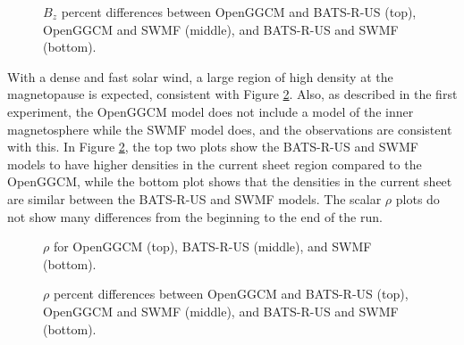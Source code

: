 \begin{figure}
	\centering
    \caption{$B_z$ percent differences between OpenGGCM and BATS-R-US (top),
    OpenGGCM and SWMF (middle), and BATS-R-US and SWMF (bottom).
    }
    \label{fig:BDiffHighEnd}
	\figSpace
\end{figure}


With a dense and fast solar wind, a large region of high density at the
magnetopause is expected, consistent with Figure
\ref{fig:rhoHighCompressionBeginning}. Also, as described in the first
experiment, the OpenGGCM model does not include a model of the inner magnetosphere while
the SWMF model does, and the observations are consistent with this.
In Figure \ref{fig:rhoHighCompressionBeginning}, the top two plots show the BATS-R-US and
SWMF models to have higher densities in the current sheet region compared to the
OpenGGCM, while the bottom plot shows that the densities in the current sheet are similar
between the BATS-R-US and SWMF models. 
The scalar $\rho$ plots do not show many differences from the beginning to the end of the run.


\begin{figure}
	\centering
	\caption{$\rho$ for OpenGGCM (top), BATS-R-US (middle), and SWMF (bottom).}
	\figSpace
	\label{fig:rhoHighCompressionBeginning}
\end{figure}

\begin{figure}
	\centering
    \caption{$\rho$ percent differences between OpenGGCM and BATS-R-US (top),
    OpenGGCM and SWMF (middle), and BATS-R-US and SWMF (bottom).
    }
    \label{fig:rhoDiffHighBeginning}
	\figSpace
\end{figure}


